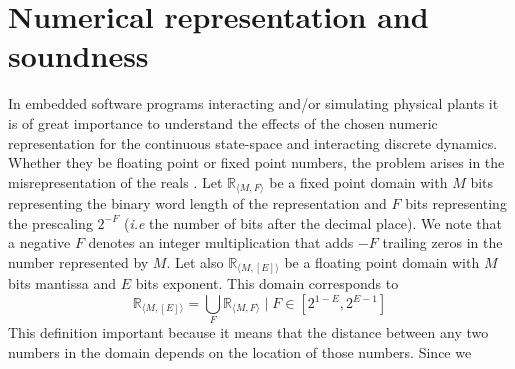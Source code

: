 \documentclass[sigconf]{llncs}
\newcommand{\jrronly}[1]{{}}
\begin{document}
\section{Numerical representation and soundness} 
\label{sec:numeric_rep}

In embedded software programs interacting and/or simulating physical plants
it is of great importance to understand the effects of the chosen numeric 
representation for the continuous state-space and interacting discrete dynamics. 
\jrronly{
These representations are almost invariably approximations to the original
which are assumed to be precise enough as to not cause any trouble,
but it is precisely this assumption that often results in the most difficult and
dangerous errors.
There are generally speaking two formats for representing numbers in
programs. On one hand we have variable word length types which will
attempt to use as much memory as needed to precisely represent the
original domain (usually the reals). In this case the limitations are caused
by memory and speed, both of which are directly affected by the
increasingly larger word lengths. Multiple precision floating-point arithmetic
and software rationals are good examples of these cases. It is possible for
some of these data types to have memory constraints, at which point they
fall into the second category.
Fixed precision data types are most common in software programs.
}
Whether they be floating point or fixed point
\jrronly{ (of which integers are the special case for 0 decimal places) }
numbers, the problem arises in the misrepresentation of the reals%
\jrronly{ (or equivalent data type being represented) }.
Let $\mathbb{R}_{\langle M,F \rangle}$ be a fixed point domain with $M$ bits
representing the binary word length of the representation and $F$ bits
representing the prescaling $2^{-F}$ (\emph{i.e} the number of bits after
the decimal place).  We note that a negative $F$ denotes an integer
multiplication that adds $-F$ trailing zeros in the number represented by
$M$.
Let also $\mathbb{R}_{\langle M,[E] \rangle}$ be a floating point
domain with $M$ bits mantissa and $E$ bits exponent.  This domain
corresponds to $$\mathbb{R}_{\langle M,[E] \rangle} = \bigcup_F
\mathbb{R}_{\langle M,F \rangle} \mid F \in [2^{1-E}, 2^{E-1}]$$ This
definition important because it means that the distance between any two
numbers in the domain depends on the location of those numbers.  Since we
\end{document}
